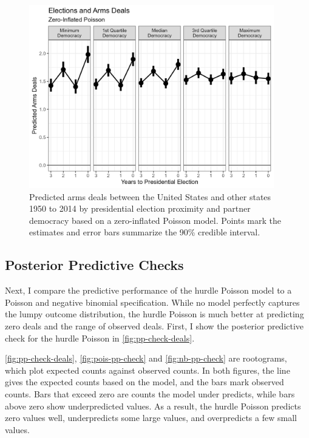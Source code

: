 \documentclass[12pt]{article}
\begin{document}
\begin{figure}[htpb]
	\centering
		\includegraphics[width=0.95\textwidth]{deals-pred-zip.png}
	\caption{{Predicted arms deals between the United States and other states 1950 to 2014 by presidential election proximity and partner democracy based on a zero-inflated Poisson model. Points mark the estimates and error bars summarize the 90\% credible interval.}}
	\label{fig:deals-pred-zip}
\end{figure}

\newpage

\subsection{Posterior Predictive Checks}


Next, I compare the predictive performance of the hurdle Poisson model to a Poisson and negative binomial specification. 
While no model perfectly captures the lumpy outcome distribution, the hurdle Poisson is much better at predicting zero deals and the range of observed deals. 
First, I show the posterior predictive check for the hurdle Poisson in \autoref{fig:pp-check-deals}. 


\autoref{fig:pp-check-deals}, \autoref{fig:pois-pp-check} and \autoref{fig:nb-pp-check} are rootograms, which plot expected counts against observed counts. 
In both figures, the line gives the expected counts based on the model, and the bars mark observed counts. 
Bars that exceed zero are counts the model under predicts, while bars above zero show underpredicted values. 
As a result, the hurdle Poisson predicts zero values well, underpredicts some large values, and overpredicts a few small values. 
\end{document}
